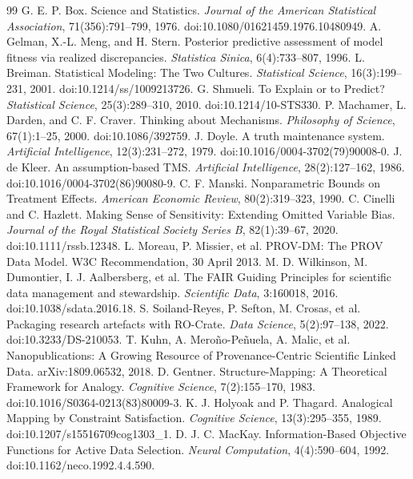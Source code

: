 \begin{thebibliography}{99}
 G. E. P. Box. Science and Statistics. \emph{Journal of the American Statistical Association}, 71(356):791--799, 1976. doi:10.1080/01621459.1976.10480949.
 A. Gelman, X.-L. Meng, and H. Stern. Posterior predictive assessment of model fitness via realized discrepancies. \emph{Statistica Sinica}, 6(4):733--807, 1996.
 L. Breiman. Statistical Modeling: The Two Cultures. \emph{Statistical Science}, 16(3):199--231, 2001. doi:10.1214/ss/1009213726.
 G. Shmueli. To Explain or to Predict? \emph{Statistical Science}, 25(3):289--310, 2010. doi:10.1214/10-STS330.
 P. Machamer, L. Darden, and C. F. Craver. Thinking about Mechanisms. \emph{Philosophy of Science}, 67(1):1--25, 2000. doi:10.1086/392759.
 J. Doyle. A truth maintenance system. \emph{Artificial Intelligence}, 12(3):231--272, 1979. doi:10.1016/0004-3702(79)90008-0.
 J. de Kleer. An assumption-based TMS. \emph{Artificial Intelligence}, 28(2):127--162, 1986. doi:10.1016/0004-3702(86)90080-9.
 C. F. Manski. Nonparametric Bounds on Treatment Effects. \emph{American Economic Review}, 80(2):319--323, 1990.
 C. Cinelli and C. Hazlett. Making Sense of Sensitivity: Extending Omitted Variable Bias. \emph{Journal of the Royal Statistical Society Series B}, 82(1):39--67, 2020. doi:10.1111/rssb.12348.
 L. Moreau, P. Missier, et al. PROV-DM: The PROV Data Model. W3C Recommendation, 30 April 2013.
 M. D. Wilkinson, M. Dumontier, I. J. Aalbersberg, et al. The FAIR Guiding Principles for scientific data management and stewardship. \emph{Scientific Data}, 3:160018, 2016. doi:10.1038/sdata.2016.18.
 S. Soiland-Reyes, P. Sefton, M. Crosas, et al. Packaging research artefacts with RO-Crate. \emph{Data Science}, 5(2):97--138, 2022. doi:10.3233/DS-210053.
 T. Kuhn, A. Mero\~no-Pe\~nuela, A. Malic, et al. Nanopublications: A Growing Resource of Provenance-Centric Scientific Linked Data. arXiv:1809.06532, 2018.
 D. Gentner. Structure-Mapping: A Theoretical Framework for Analogy. \emph{Cognitive Science}, 7(2):155--170, 1983. doi:10.1016/S0364-0213(83)80009-3.
 K. J. Holyoak and P. Thagard. Analogical Mapping by Constraint Satisfaction. \emph{Cognitive Science}, 13(3):295--355, 1989. doi:10.1207/s15516709cog1303\_1.
 D. J. C. MacKay. Information-Based Objective Functions for Active Data Selection. \emph{Neural Computation}, 4(4):590--604, 1992. doi:10.1162/neco.1992.4.4.590.

\end{thebibliography}
